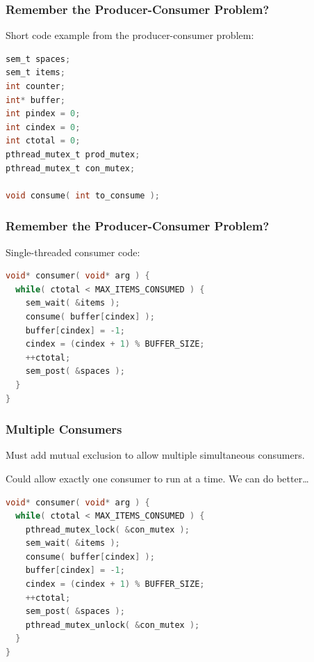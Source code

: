 \begin{frame}[fragile]
\frametitle{Remember the Producer-Consumer Problem?}

Short code example from the producer-consumer problem:

\begin{lstlisting}[language=C]
sem_t spaces;
sem_t items;
int counter;
int* buffer;
int pindex = 0;
int cindex = 0;
int ctotal = 0;
pthread_mutex_t prod_mutex;
pthread_mutex_t con_mutex;

void consume( int to_consume );

\end{lstlisting}


\end{frame}


\begin{frame}[fragile]
\frametitle{Remember the Producer-Consumer Problem?}

Single-threaded consumer code:

\begin{lstlisting}[language=C]
void* consumer( void* arg ) { 
  while( ctotal < MAX_ITEMS_CONSUMED ) {
    sem_wait( &items );
    consume( buffer[cindex] );
    buffer[cindex] = -1;
    cindex = (cindex + 1) % BUFFER_SIZE;
    ++ctotal;
    sem_post( &spaces );
  }
}
\end{lstlisting}


\end{frame}


\begin{frame}[fragile]
\frametitle{Multiple Consumers}
Must add mutual exclusion to allow multiple simultaneous consumers.

Could allow exactly one consumer to run at a time. We can do better\ldots

\begin{lstlisting}[language=C]
void* consumer( void* arg ) { 
  while( ctotal < MAX_ITEMS_CONSUMED ) {
    pthread_mutex_lock( &con_mutex );
    sem_wait( &items );
    consume( buffer[cindex] );
    buffer[cindex] = -1;
    cindex = (cindex + 1) % BUFFER_SIZE;
    ++ctotal;
    sem_post( &spaces );
    pthread_mutex_unlock( &con_mutex );
  }
}
\end{lstlisting}


\end{frame}


